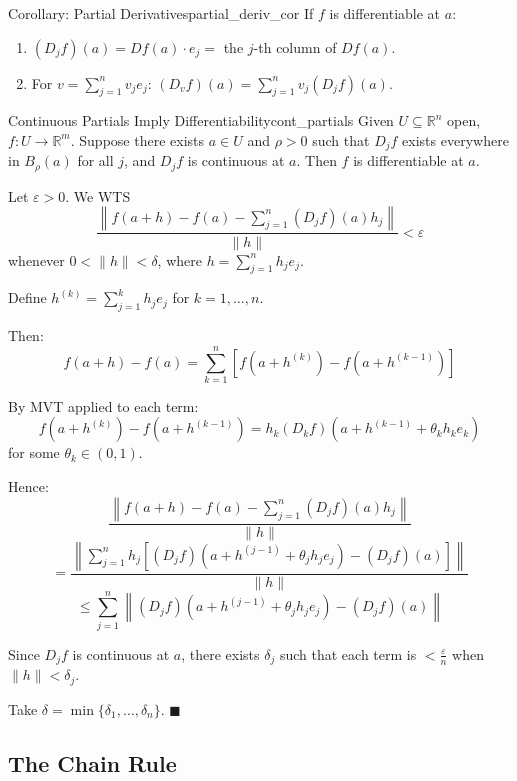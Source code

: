 \documentclass[11pt, letterpaper, openany]{book}
\renewenvironment{proof}[1][\proofname]{%
  \tcolorbox[blanker, breakable, left=1em,
    before skip=1em, after skip=1em,
    borderline west={2pt}{0pt}{MagicTeal!50},
    colback=MagicCream,
    before upper={\textcolor{MagicTeal}{\sffamily\bfseries #1.}\space}
  ]%
}{%
  \hfill\textcolor{MagicTeal}{\ensuremath{\blacksquare}}\endtcolorbox%
}
\begin{document}
\begin{thm}{Corollary: Partial Derivatives}{partial_deriv_cor}
If $f$ is differentiable at $a$:
\begin{enumerate}
    \item $(D_j f)(a) = Df(a) \cdot e_j =$ the $j$-th column of $Df(a)$.
    \item For $v = \sum_{j=1}^n v_j e_j$: $(D_v f)(a) = \sum_{j=1}^n v_j (D_j f)(a)$.
\end{enumerate}
\end{thm}

\begin{thm}{Continuous Partials Imply Differentiability}{cont_partials}
Given $U \subseteq \mathbb{R}^n$ open, $f: U \to \mathbb{R}^m$. Suppose there exists $a \in U$ and $\rho > 0$ such that $D_j f$ exists everywhere in $B_\rho(a)$ for all $j$, and $D_j f$ is continuous at $a$. Then $f$ is differentiable at $a$.
\end{thm}

\begin{proof}
Let $\varepsilon > 0$. We WTS 
\[\frac{\left\|f(a+h) - f(a) - \sum_{j=1}^n (D_j f)(a) h_j\right\|}{\|h\|} < \varepsilon\]
whenever $0 < \|h\| < \delta$, where $h = \sum_{j=1}^n h_j e_j$.

Define $h^{(k)} = \sum_{j=1}^k h_j e_j$ for $k = 1, \ldots, n$.

Then:
\[f(a+h) - f(a) = \sum_{k=1}^n \left[f(a + h^{(k)}) - f(a + h^{(k-1)})\right]\]

By MVT applied to each term:
\[f(a + h^{(k)}) - f(a + h^{(k-1)}) = h_k (D_k f)(a + h^{(k-1)} + \theta_k h_k e_k)\]
for some $\theta_k \in (0, 1)$.

Hence:
\[\frac{\left\|f(a+h) - f(a) - \sum_{j=1}^n (D_j f)(a) h_j\right\|}{\|h\|}\]
\[= \frac{\left\|\sum_{j=1}^n h_j \left[(D_j f)(a + h^{(j-1)} + \theta_j h_j e_j) - (D_j f)(a)\right]\right\|}{\|h\|}\]
\[\leq \sum_{j=1}^n \left\|(D_j f)(a + h^{(j-1)} + \theta_j h_j e_j) - (D_j f)(a)\right\|\]

Since $D_j f$ is continuous at $a$, there exists $\delta_j$ such that each term is $< \frac{\varepsilon}{n}$ when $\|h\| < \delta_j$.

Take $\delta = \min\{\delta_1, \ldots, \delta_n\}$.
\end{proof}

\subsection{The Chain Rule}
\end{document}
